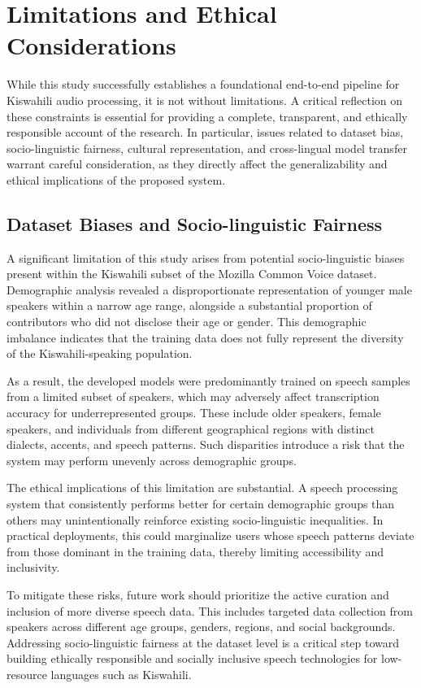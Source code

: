 \section{Limitations and Ethical Considerations}

While this study successfully establishes a foundational end-to-end pipeline for Kiswahili audio processing, it is not without limitations. A critical reflection on these constraints is essential for providing a complete, transparent, and ethically responsible account of the research. In particular, issues related to dataset bias, socio-linguistic fairness, cultural representation, and cross-lingual model transfer warrant careful consideration, as they directly affect the generalizability and ethical implications of the proposed system.

\subsection{Dataset Biases and Socio-linguistic Fairness}

A significant limitation of this study arises from potential socio-linguistic biases present within the Kiswahili subset of the Mozilla Common Voice dataset. Demographic analysis revealed a disproportionate representation of younger male speakers within a narrow age range, alongside a substantial proportion of contributors who did not disclose their age or gender. This demographic imbalance indicates that the training data does not fully represent the diversity of the Kiswahili-speaking population.

As a result, the developed models were predominantly trained on speech samples from a limited subset of speakers, which may adversely affect transcription accuracy for underrepresented groups. These include older speakers, female speakers, and individuals from different geographical regions with distinct dialects, accents, and speech patterns. Such disparities introduce a risk that the system may perform unevenly across demographic groups.

The ethical implications of this limitation are substantial. A speech processing system that consistently performs better for certain demographic groups than others may unintentionally reinforce existing socio-linguistic inequalities. In practical deployments, this could marginalize users whose speech patterns deviate from those dominant in the training data, thereby limiting accessibility and inclusivity.

To mitigate these risks, future work should prioritize the active curation and inclusion of more diverse speech data. This includes targeted data collection from speakers across different age groups, genders, regions, and social backgrounds. Addressing socio-linguistic fairness at the dataset level is a critical step toward building ethically responsible and socially inclusive speech technologies for low-resource languages such as Kiswahili.

